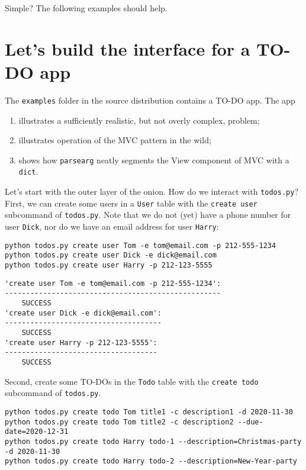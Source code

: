 \documentclass[10pt]{amsart}
\numberwithin{equation}{section}
\begin{document}
Simple? The following examples should help.

\section{Let's build the interface for a TO-DO app}
\label{sec:org8b704b5}
The \texttt{examples} folder in the source distribution contains a TO-DO app.
The app

\begin{enumerate}
\item illustrates a sufficiently realistic, but not overly complex, problem;
\item illustrates operation of the MVC pattern in the wild;
\item shows how \texttt{parsearg} neatly segments the View component of MVC with a \texttt{dict}.
\end{enumerate}

Let's start with the outer layer of the onion. How do we interact with
\texttt{todos.py}?  First, we can create some users in a \texttt{User} table with the 
\texttt{create user} subcommand of \texttt{todos.py}.  Note that we do not (yet) have a phone
number for user \texttt{Dick}, nor do we have an email address for user \texttt{Harry}:
\begin{verbatim}
python todos.py create user Tom -e tom@email.com -p 212-555-1234
python todos.py create user Dick -e dick@email.com
python todos.py create user Harry -p 212-123-5555
\end{verbatim}

\begin{verbatim}
'create user Tom -e tom@email.com -p 212-555-1234':
---------------------------------------------------
	SUCCESS
'create user Dick -e dick@email.com':
-------------------------------------
	SUCCESS
'create user Harry -p 212-123-5555':
------------------------------------
	SUCCESS
\end{verbatim}


Second, create some TO-DOs in the \texttt{Todo} table with the \texttt{create todo} subcommand of \texttt{todos.py}. 
\begin{verbatim}
python todos.py create todo Tom title1 -c description1 -d 2020-11-30
python todos.py create todo Tom title2 -c description2 --due-date=2020-12-31
python todos.py create todo Harry todo-1 --description=Christmas-party -d 2020-11-30
python todos.py create todo Harry todo-2 --description=New-Year-party
\end{verbatim}
\end{document}
